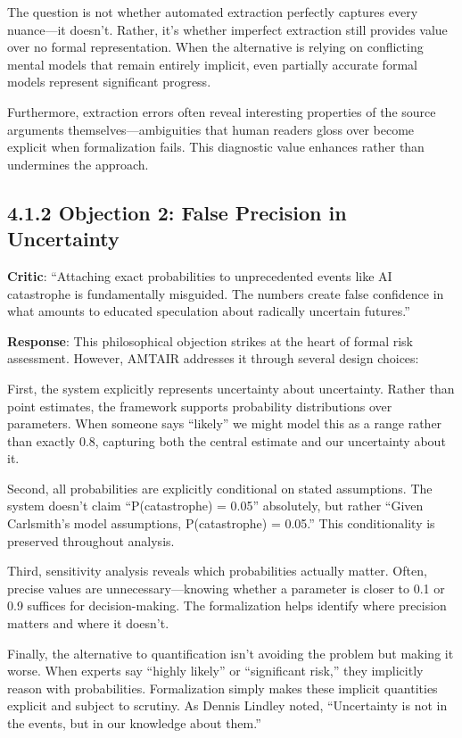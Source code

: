 \documentclass[
  11pt,
  letterpaper,
]{book}
\begin{document}
The question is not whether automated extraction perfectly captures
every nuance---it doesn't. Rather, it's whether imperfect extraction
still provides value over no formal representation. When the alternative
is relying on conflicting mental models that remain entirely implicit,
even partially accurate formal models represent significant progress.

Furthermore, extraction errors often reveal interesting properties of
the source arguments themselves---ambiguities that human readers gloss
over become explicit when formalization fails. This diagnostic value
enhances rather than undermines the approach.

\subsection{4.1.2 Objection 2: False Precision in
Uncertainty}\label{sec-false-precision}

\textbf{Critic}: ``Attaching exact probabilities to unprecedented events
like AI catastrophe is fundamentally misguided. The numbers create false
confidence in what amounts to educated speculation about radically
uncertain futures.''

\textbf{Response}: This philosophical objection strikes at the heart of
formal risk assessment. However, AMTAIR addresses it through several
design choices:

First, the system explicitly represents uncertainty about uncertainty.
Rather than point estimates, the framework supports probability
distributions over parameters. When someone says ``likely'' we might
model this as a range rather than exactly 0.8, capturing both the
central estimate and our uncertainty about it.

Second, all probabilities are explicitly conditional on stated
assumptions. The system doesn't claim ``P(catastrophe) = 0.05''
absolutely, but rather ``Given Carlsmith's model assumptions,
P(catastrophe) = 0.05.'' This conditionality is preserved throughout
analysis.

Third, sensitivity analysis reveals which probabilities actually matter.
Often, precise values are unnecessary---knowing whether a parameter is
closer to 0.1 or 0.9 suffices for decision-making. The formalization
helps identify where precision matters and where it doesn't.

Finally, the alternative to quantification isn't avoiding the problem
but making it worse. When experts say ``highly likely'' or ``significant
risk,'' they implicitly reason with probabilities. Formalization simply
makes these implicit quantities explicit and subject to scrutiny. As
Dennis Lindley noted, ``Uncertainty is not in the events, but in our
knowledge about them.''
\end{document}
